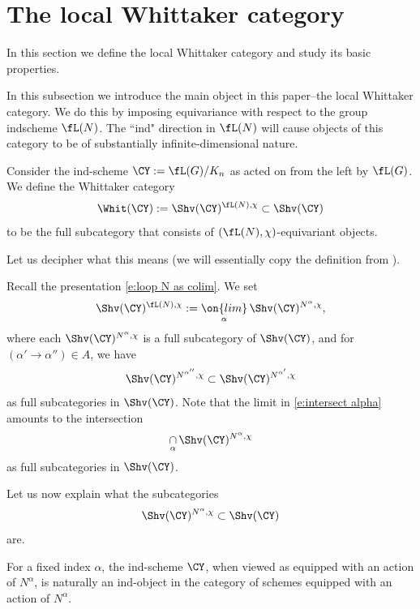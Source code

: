 \documentclass[9pt]{amsart}
\theoremstyle{definition}
\theoremstyle{remark}
\numberwithin{equation}{section}
\begin{document}
\section{The local Whittaker category}  \label{s:loc Whit}

In this section we define the local Whittaker category and study its basic properties. 

  \label{ss:inv}

In this subsection we introduce the main object in this paper--the local Whittaker category.  We do this by imposing
equivariance with respect to the group indscheme $\fL(N)$. The ``ind" direction in $\fL(N)$ will cause objects of this 
category to be of substantially infinite-dimensional nature. 

\sssec{}

Consider the ind-scheme $\CY:=\fL(G)/K_n$ as acted on from the left by $\fL(G)$. We define the Whittaker
category $$\Whit(\CY):=\Shv(\CY)^{\fL(N),\chi}\subset \Shv(\CY)$$
to be the full subcategory that consists of $(\fL(N),\chi)$-equivariant objects. 

\medskip

Let us decipher what this means (we will essentially copy the definition from \cite[Sect. 1.2]{Ga1}).

\sssec{}  \label{sss:N alpha}

Recall the presentation \eqref{e:loop N as colim}. We set
\begin{equation} \label{e:intersect alpha} 
\Shv(\CY)^{\fL(N),\chi}:=\underset{\alpha}{\on{lim}}\, \Shv(\CY)^{N^\alpha,\chi},
\end{equation} 
where each $\Shv(\CY)^{N^\alpha,\chi}$ is a full subcategory of $\Shv(\CY)$, and for $(\alpha'\to \alpha'')\in A$, we have
$$\Shv(\CY)^{N^{\alpha''},\chi}\subset \Shv(\CY)^{N^{\alpha'},\chi}$$
as full subcategories in $\Shv(\CY)$. Note that the limit in \eqref{e:intersect alpha} amounts to the intersection
$$\underset{\alpha}\cap\, \Shv(\CY)^{N^\alpha,\chi}$$
as full subcategories in $\Shv(\CY)$.

\medskip

Let us now explain what the subcategories 
$$\Shv(\CY)^{N^\alpha,\chi}\subset \Shv(\CY)$$
are. 

\sssec{}

For a fixed index $\alpha$, the ind-scheme $\CY$, when viewed as equipped with an action of $N^\alpha$,
is naturally an ind-object in the category of schemes equipped with an action of $N^\alpha$.
\end{document}

